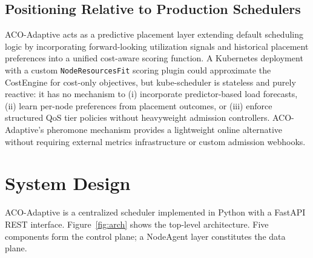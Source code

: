 \documentclass[conference]{IEEEtran}
\begin{document}
\subsection{Positioning Relative to Production Schedulers}

ACO-Adaptive acts as a predictive placement layer extending default
scheduling logic by incorporating forward-looking utilization signals and
historical placement preferences into a unified cost-aware scoring
function. A Kubernetes deployment with a custom \texttt{NodeResourcesFit}
scoring plugin could approximate the CostEngine for cost-only objectives,
but kube-scheduler is stateless and purely reactive: it has no mechanism
to (i) incorporate predictor-based load forecasts, (ii) learn per-node
preferences from placement outcomes, or (iii) enforce structured QoS tier
policies without heavyweight admission controllers. ACO-Adaptive's
pheromone mechanism provides a lightweight online alternative without
requiring external metrics infrastructure or custom admission webhooks.


\section{System Design}

ACO-Adaptive is a centralized scheduler implemented in Python with a
FastAPI REST interface. Figure~\ref{fig:arch} shows the top-level
architecture. Five components form the control plane; a NodeAgent layer
constitutes the data plane.
\end{document}
